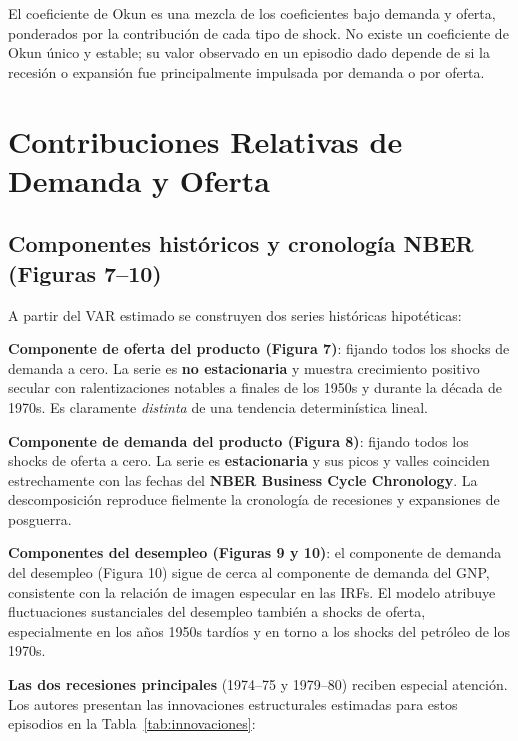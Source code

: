 \documentclass[12pt]{article}
\begin{document}
\begin{intuicion}
El coeficiente de Okun es una mezcla de los coeficientes bajo demanda y oferta, ponderados por la contribuci\'on de cada tipo de shock. No existe un coeficiente de Okun \'unico y estable; su valor observado en un episodio dado depende de si la recesi\'on o expansi\'on fue principalmente impulsada por demanda o por oferta.
\end{intuicion}

\section{Contribuciones Relativas de Demanda y Oferta}

\subsection{Componentes hist\'oricos y cronolog\'ia NBER (Figuras 7--10)}

A partir del VAR estimado se construyen dos series hist\'oricas hipot\'eticas:

\textbf{Componente de oferta del producto (Figura 7)}: fijando todos los shocks de demanda a cero. La serie es \textbf{no estacionaria} y muestra crecimiento positivo secular con ralentizaciones notables a finales de los 1950s y durante la d\'ecada de 1970s. Es claramente \emph{distinta} de una tendencia determin\'istica lineal.

\textbf{Componente de demanda del producto (Figura 8)}: fijando todos los shocks de oferta a cero. La serie es \textbf{estacionaria} y sus picos y valles coinciden estrechamente con las fechas del \textbf{NBER Business Cycle Chronology}. La descomposici\'on reproduce fielmente la cronolog\'ia de recesiones y expansiones de posguerra.

\textbf{Componentes del desempleo (Figuras 9 y 10)}: el componente de demanda del desempleo (Figura 10) sigue de cerca al componente de demanda del GNP, consistente con la relaci\'on de imagen especular en las IRFs. El modelo atribuye fluctuaciones sustanciales del desempleo tambi\'en a shocks de oferta, especialmente en los a\~nos 1950s tard\'ios y en torno a los shocks del petr\'oleo de los 1970s.

\textbf{Las dos recesiones principales} (1974--75 y 1979--80) reciben especial atenci\'on. Los autores presentan las innovaciones estructurales estimadas para estos episodios en la Tabla~\ref{tab:innovaciones}:
\end{document}
